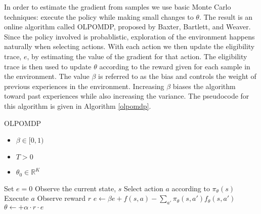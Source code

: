 In order to estimate the gradient from samples we use basic Monte Carlo techniques: execute the policy while making small changes to $\theta$. The result is an online algorithm called OLPOMDP, proposed by Baxter, Bartlett, and Weaver. \cite{olpomdp} Since the policy involved is probablistic, exploration of the environment happens naturally when selecting actions. With each action we then update the eligibility trace, $e$, by estimating the value of the gradient for that action. The eligibility trace is then used to update $\theta$ according to the reward given for each sample in the environment. The value $\beta$ is referred to as the bias and controls the weight of previous experiences in the environment. Increasing $\beta$ biases the algorithm toward past experiences while also increasing the variance. The pseudocode for this algorithm is given in Algorithm \ref{olpomdp}.

\begin{algorithm}
\caption{OLPOMDP}
\label{olpomdp}
    \begin{algorithmic}[1]
        \REQUIRE
            \begin{itemize} 
                \item $\beta \in [0,1)$ 
                \item $T > 0$ 
                \item $\theta_0 \in \mathbb{R}^K$ 
            \end{itemize}
    \STATE Set $e = 0$
        \STATE Observe the current state, $s$
        \STATE Select action $a$ according to $\pi_\theta(s)$
        \STATE Execute $a$
        \STATE Observe reward $r$
        \STATE $e \leftarrow \beta e + f(s,a) - \sum\limits_{a'}\pi_\theta(s,a')f_\theta(s,a')$
        \STATE $\theta \leftarrow + \alpha \cdot r \cdot e$
    \ENDFOR
    \end{algorithmic}
\end{algorithm}

